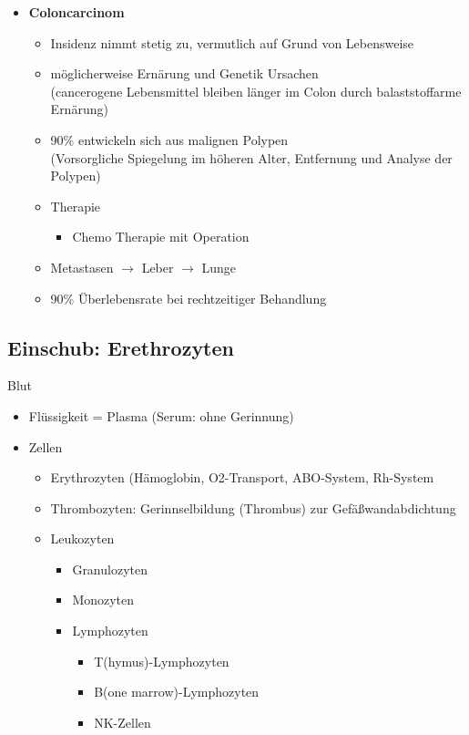 \begin{itemize}
			\item \textbf{Coloncarcinom}
				\begin{itemize}
					\item Insidenz nimmt stetig zu, vermutlich auf Grund von Lebensweise
					\item möglicherweise Ernärung und Genetik Ursachen\\
						(cancerogene Lebensmittel bleiben länger im Colon durch balaststoffarme Ernärung)
					\item 90\% entwickeln sich aus malignen Polypen\\
						(Vorsorgliche Spiegelung im höheren Alter, Entfernung und Analyse der Polypen)
					\item Therapie
						\begin{itemize}
							\item Chemo Therapie mit Operation
						\end{itemize}
					\item Metastasen $\rightarrow$ Leber $\rightarrow$ Lunge 
					\item 90\% Überlebensrate bei rechtzeitiger Behandlung
				\end{itemize}
				
		\end{itemize}
		\subsection*{Einschub: Erethrozyten}
		Blut
			\begin{itemize}
				\item Flüssigkeit = Plasma (Serum: ohne Gerinnung)
				\item Zellen
					\begin{itemize}
						\item Erythrozyten (Hämoglobin, O2-Transport, ABO-System, Rh-System
						\item Thrombozyten: Gerinnselbildung (Thrombus) zur Gefäßwandabdichtung
						\item Leukozyten
							\begin{itemize}
								\item Granulozyten
								\item Monozyten	
								\item Lymphozyten
									\begin{itemize}
										\item T(hymus)-Lymphozyten
										\item B(one marrow)-Lymphozyten
										\item NK-Zellen
									\end{itemize}
							\end{itemize}
								
					\end{itemize}
			\end{itemize}